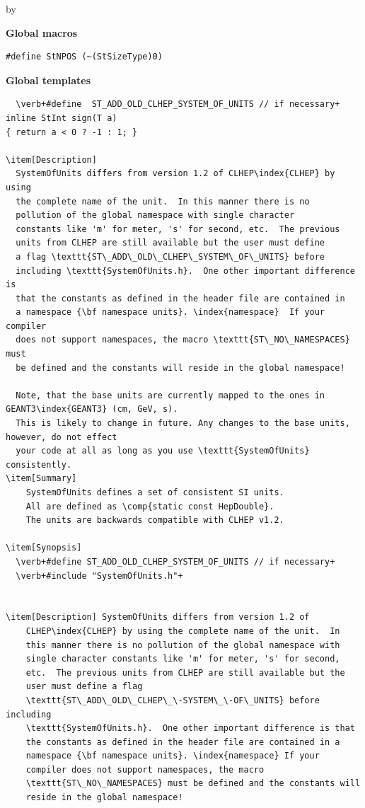\documentclass[twoside]{article}
\newcommand{\comp}[1]{\texttt{#1}}%
\newcommand{\entrylabel}[1]{\mbox{\textbf{{#1}}}\hfil}%
\newenvironment{entry}
{\begin{list}{}%
    {\renewcommand{\makelabel}{\entrylabel}%
     \setlength{\labelwidth}{90pt}%
     \setlength{\leftmargin}{\labelwidth}
     \advance\leftmargin by \labelsep%
      }%
    }%
  {\end{list}}
\newcommand{\Entrylabel}[1]%
{\raisebox{0pt}[1ex][0pt]{\makebox[\labelwidth][l]%
    {\parbox[t]{\labelwidth}{\hspace{0pt}\textbf{{#1}}}}}}
\newenvironment{Entry}%
{\renewcommand{\entrylabel}{\Entrylabel}\begin{entry}}%
  {\end{entry}}
\begin{document}
\begin{description}
\begin{Entry}
{\bf Global macros} \\ 
\begin{verbatim}  
#define StNPOS (~(StSizeType)0)
\end{verbatim}

{\bf Global templates} \\  
\begin{verbatim}
  \verb+#define  ST_ADD_OLD_CLHEP_SYSTEM_OF_UNITS // if necessary+
inline StInt sign(T a)
{ return a < 0 ? -1 : 1; }

\item[Description]
  SystemOfUnits differs from version 1.2 of CLHEP\index{CLHEP} by using
  the complete name of the unit.  In this manner there is no
  pollution of the global namespace with single character
  constants like 'm' for meter, 's' for second, etc.  The previous
  units from CLHEP are still available but the user must define
  a flag \texttt{ST\_ADD\_OLD\_CLHEP\_SYSTEM\_OF\_UNITS} before
  including \texttt{SystemOfUnits.h}.  One other important difference is
  that the constants as defined in the header file are contained in
  a namespace {\bf namespace units}. \index{namespace}  If your compiler
  does not support namespaces, the macro \texttt{ST\_NO\_NAMESPACES} must
  be defined and the constants will reside in the global namespace!

  Note, that the base units are currently mapped to the ones in GEANT3\index{GEANT3} (cm, GeV, s).
  This is likely to change in future. Any changes to the base units, however, do not effect
  your code at all as long as you use \texttt{SystemOfUnits} consistently.
\item[Summary]
    SystemOfUnits defines a set of consistent SI units.
    All are defined as \comp{static const HepDouble}.
    The units are backwards compatible with CLHEP v1.2.

\item[Synopsis]
  \verb+#define ST_ADD_OLD_CLHEP_SYSTEM_OF_UNITS // if necessary+
  \verb+#include "SystemOfUnits.h"+
    
    
\item[Description] SystemOfUnits differs from version 1.2 of
    CLHEP\index{CLHEP} by using the complete name of the unit.  In
    this manner there is no pollution of the global namespace with
    single character constants like 'm' for meter, 's' for second,
    etc.  The previous units from CLHEP are still available but the
    user must define a flag
    \texttt{ST\_ADD\_OLD\_CLHEP\_\-SYSTEM\_\-OF\_UNITS} before including
    \texttt{SystemOfUnits.h}.  One other important difference is that
    the constants as defined in the header file are contained in a
    namespace {\bf namespace units}. \index{namespace} If your
    compiler does not support namespaces, the macro
    \texttt{ST\_NO\_NAMESPACES} must be defined and the constants will
    reside in the global namespace!
    

\end{verbatim}
\end{Entry}
\end{description}
\end{document}
